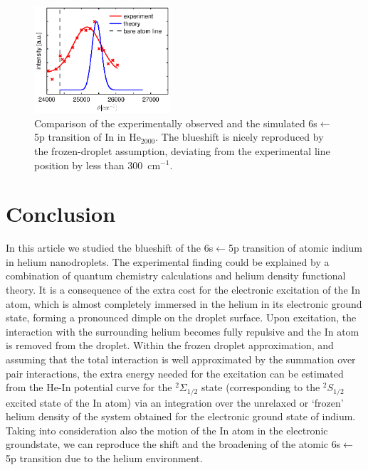 \documentclass[twoside,twocolumn,9pt]{article}
\begin{document}
\begin{figure}[htbp!]
  	\begin{center}
 		\includegraphics[width=0.45\textwidth]{7.eps}
                \caption{Comparison of the experimentally observed and the simulated 6s$\leftarrow{}$5p transition of In in He$_{2000}$. The blueshift is nicely reproduced by the frozen-droplet assumption, deviating from the experimental line position by less than 300~cm$^{-1}$. \label{pic:final}}
  	\end{center}
\end{figure}

\section{Conclusion}
In this article we studied the blueshift of the 6s$\leftarrow{}$5p transition of atomic indium in helium nanodroplets. The experimental finding could be explained by a combination of quantum chemistry calculations and helium density functional theory. It is a consequence of the extra cost for the electronic excitation of the In atom, which is almost completely immersed in the helium in its electronic ground state, forming a pronounced dimple on the droplet surface. Upon excitation, the interaction with the surrounding helium becomes fully repulsive and the In atom is removed from the droplet. Within the frozen droplet approximation, and assuming that the total interaction is well approximated by the summation over pair interactions, the extra energy needed for the excitation can be estimated from the He-In potential curve for the  $^2\Sigma_{1/2}$ state (corresponding to the $^2S_{1/2}$ excited state of the In atom) via an integration over the unrelaxed or `frozen' helium density of the system obtained for the electronic ground state of indium. Taking into consideration also the motion of the In atom in the electronic groundstate, we can reproduce the shift and the broadening of the atomic 6s$\leftarrow{}$5p transition due to the helium environment.


\end{document}

